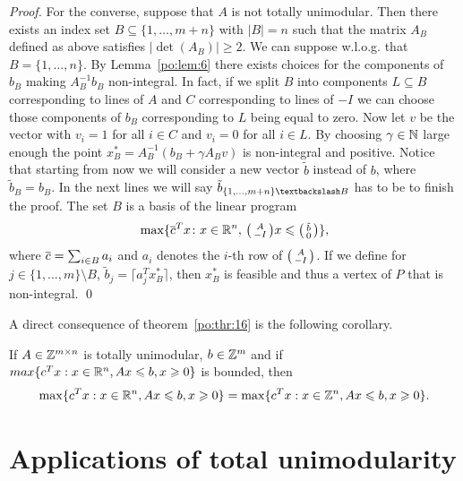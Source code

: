 \begin{proof}
  
  For the converse, suppose that $A$ is not totally unimodular. Then
  there exists an index set $B \subseteq\{1,\ldots,m+n\}$ with $|B| = n$ such that
  the matrix $A_B$ defined as above satisfies $|\det(A_B)| \geq  2$. We can suppose w.l.o.g. that $B = \{1, \ldots, n\}.$ By
  Lemma~\ref{po:lem:6} there exists choices for the components of
  $b_B$ making $A_B^{-1} b_B$ non-integral. In fact, if we split $B$
  into components $L \subseteq B$  corresponding to lines of $A$ and $C$
  corresponding to lines of $-I$ we can choose those components of
  $b_B$ corresponding to $L$ being equal to zero. Now let $v$ be the
  vector with $v_i = 1$ for all $i\in C$ and $v_i = 0 $ for all $i \in
  L$. 
  By choosing $\gamma \in \mathbb{N}$ large enough the point $x^*_B = A_B^{-1} (b_B
  + \gamma A_B v)$ is non-integral and positive. Notice that
  starting from now we will consider a new vector $\tilde{b}$
  instead of 
  $b$, where $\tilde{b}_B = b_B$. In the next lines we will 
  say $\tilde{b}_{\{1, \ldots, m+n\} \textbackslash B}$ has to
  be to finish the proof.
  The set $B$ is a
  basis of the linear program 
  \begin{displaymath}
       \max\{\overline{c}^Tx \colon x \in \mathbb{R}^n, \, \big(\begin{smallmatrix} A\\-I \end{smallmatrix}\big) x\leqslant \big(\begin{smallmatrix} \tilde{b}\\0 \end{smallmatrix}\big) \},
  \end{displaymath}
  where $\overline{c} = \sum_{i \in B} a_i$ and $a_i$ denotes the $i$-th row of
  $\big(\begin{smallmatrix} A\\-I \end{smallmatrix}\big)$. If we define for $j \in \{1,\ldots,m\} \setminus B$,  $\tilde{b}_j =
  \lceil a_j^Tx^*_B\rceil$, then $x^*_B$ is feasible and thus a vertex of $P$
  that is non-integral. 
  \qed
  
\end{proof}

A direct consequence of theorem~\ref{po:thr:16} is the following 
corollary.

\begin{corollary}
   If $A \in \mathbb{Z}^{m \times n}$ is totally unimodular, 
   $b \in \mathbb{Z}^m$ and if 
   $max\{c^Tx: x \in \mathbb{R}^n, Ax \leqslant b, x \geqslant 0\}$ is bounded, 
   then 
   \begin{displaymath}
      \max\{c^Tx: x \in \mathbb{R}^n, Ax \leqslant b, x \geqslant 0\} = \max\{c^Tx: x \in \mathbb{Z}^n, Ax \leqslant b, x \geqslant 0\}.
   \end{displaymath}
\end{corollary}

\section{Applications of total unimodularity}

